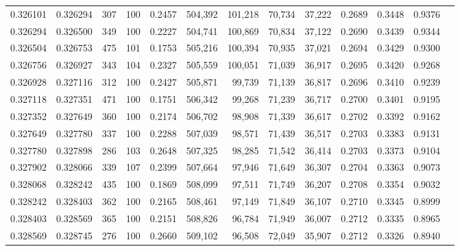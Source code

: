 \begin{tabular}{rrrrrrrrrrrrr}
0.326101 & 0.326294 &   307 & 100 &                                     0.2457 & 504,392 & 101,218 &  70,734 &  37,222 & 0.2689 & 0.3448 & 0.9376 \\
0.326294 & 0.326500 &   349 & 100 &                                     0.2227 & 504,741 & 100,869 &  70,834 &  37,122 & 0.2690 & 0.3439 & 0.9344 \\
0.326504 & 0.326753 &   475 & 101 &                                     0.1753 & 505,216 & 100,394 &  70,935 &  37,021 & 0.2694 & 0.3429 & 0.9300 \\
0.326756 & 0.326927 &   343 & 104 &                                     0.2327 & 505,559 & 100,051 &  71,039 &  36,917 & 0.2695 & 0.3420 & 0.9268 \\
0.326928 & 0.327116 &   312 & 100 &                                     0.2427 & 505,871 &  99,739 &  71,139 &  36,817 & 0.2696 & 0.3410 & 0.9239 \\
0.327118 & 0.327351 &   471 & 100 &                                     0.1751 & 506,342 &  99,268 &  71,239 &  36,717 & 0.2700 & 0.3401 & 0.9195 \\
0.327352 & 0.327649 &   360 & 100 &                                     0.2174 & 506,702 &  98,908 &  71,339 &  36,617 & 0.2702 & 0.3392 & 0.9162 \\
0.327649 & 0.327780 &   337 & 100 &                                     0.2288 & 507,039 &  98,571 &  71,439 &  36,517 & 0.2703 & 0.3383 & 0.9131 \\
0.327780 & 0.327898 &   286 & 103 &                                     0.2648 & 507,325 &  98,285 &  71,542 &  36,414 & 0.2703 & 0.3373 & 0.9104 \\
0.327902 & 0.328066 &   339 & 107 &                                     0.2399 & 507,664 &  97,946 &  71,649 &  36,307 & 0.2704 & 0.3363 & 0.9073 \\
0.328068 & 0.328242 &   435 & 100 &                                     0.1869 & 508,099 &  97,511 &  71,749 &  36,207 & 0.2708 & 0.3354 & 0.9032 \\
0.328242 & 0.328403 &   362 & 100 &                                     0.2165 & 508,461 &  97,149 &  71,849 &  36,107 & 0.2710 & 0.3345 & 0.8999 \\
0.328403 & 0.328569 &   365 & 100 &                                     0.2151 & 508,826 &  96,784 &  71,949 &  36,007 & 0.2712 & 0.3335 & 0.8965 \\
0.328569 & 0.328745 &   276 & 100 &                                     0.2660 & 509,102 &  96,508 &  72,049 &  35,907 & 0.2712 & 0.3326 & 0.8940 \\

\end{tabular}
